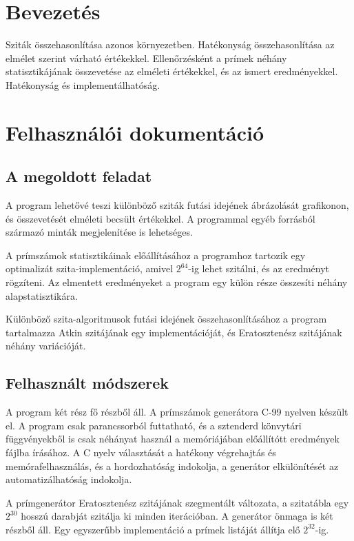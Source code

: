 \documentclass[12pt]{report}
\begin{document}
\tableofcontents

\chapter{Bevezetés}

Sziták összehasonlítása azonos környezetben.
Hatékonyság összehasonlítása az elmélet szerint várható értékekkel.
Ellenőrzésként a prímek néhány statisztikájának összevetése az elméleti értékekkel,
és az ismert eredményekkel.
Hatékonyság és implementálhatóság.

\chapter{Felhasználói dokumentáció}

\section{A megoldott feladat}

A program lehetővé teszi különböző sziták futási idejének ábrázolását grafikonon,
és összevetését elméleti becsült értékekkel.
A programmal egyéb forrásból származó minták megjelenítése is lehetséges.

A prímszámok statisztikáinak előállításához a programhoz tartozik egy optimalizát
szita-implementáció, amivel $2^{64}$-ig lehet szitálni, és az eredményt rögzíteni.
Az elmentett eredményeket a program egy külön része összesíti néhány alapstatisztikára.

Különböző szita-algoritmusok futási idejének összehasonlításához a program tartalmazza
Atkin szitájának egy implementációját, és Eratosztenész szitájának néhány variációját.

\section{Felhasznált módszerek}

A program két rész fő részből áll.
A prímszámok generátora C-99 nyelven készült el.
A program csak parancssorból futtatható, és a sztenderd könvytári függvényekből
is csak néhányat használ a memóriájában előállítótt eredmények fájlba írásához.
A C nyelv választását a hatékony végrehajtás és memórafelhasználás, és
a hordozhatóság indokolja, a generátor elkülönítését az automatizálhatóság indokolja.

A prímgenerátor Eratosztenész szitájának szegmentált változata,
a szitatábla egy $2^{30}$ hosszú darabját szitálja ki minden iterációban.
A generátor önmaga is két részből áll.
Egy egyszerűbb implementáció a prímek listáját állítja elő $2^{32}$-ig.
\end{document}
